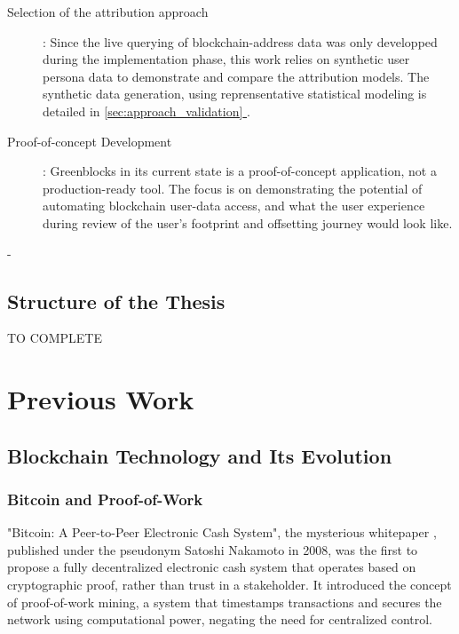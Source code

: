 \documentclass[11pt]{report}
\newcommand*{\fullref}[1]{\hyperref[{#1}]{\autoref*{#1} \nameref*{#1}}}
\begin{document}
\begin{description}
    \item [Selection of the attribution approach]: Since the live querying of blockchain-address data was only developped during the implementation phase, this work relies on synthetic user persona data to demonstrate and compare the attribution models. The synthetic data generation, using reprensentative statistical modeling is detailed in \fullref{sec:approach_validation}.
    \item [Proof-of-concept Development]: Greenblocks in its current state is a proof-of-concept application, not a production-ready tool. The focus is on demonstrating the potential of automating blockchain user-data access, and what the user experience during review of the user's footprint and offsetting journey would look like.

\end{description}


-



\section{Structure of the Thesis}
TO COMPLETE

\chapter{Previous Work} \label{ch:previous_work}


\section{Blockchain Technology and Its Evolution}
\subsection{Bitcoin and Proof-of-Work}
"Bitcoin: A Peer-to-Peer Electronic Cash System", the mysterious whitepaper \cite{nakamotoBitcoinPeertopeerElectronic2008}, published under the pseudonym Satoshi Nakamoto in 2008, was the first to propose a fully decentralized electronic cash system that operates based on cryptographic proof, rather than trust in a stakeholder. It introduced the concept of proof-of-work mining, a system that timestamps transactions and secures the network using computational power, negating the need for centralized control.
\end{document}
